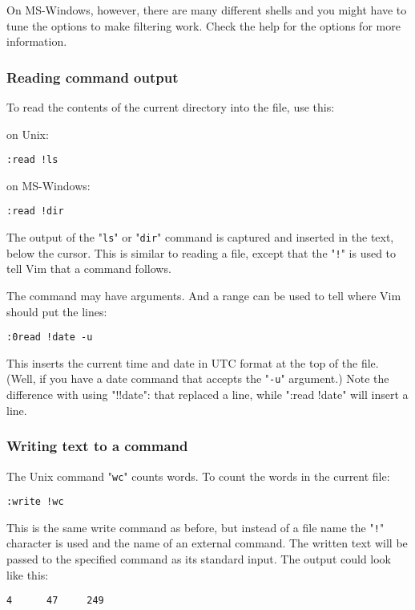 On MS-Windows, however, there are many different shells and you might have to tune the options to make filtering work.
Check the help for the options for more information.
\subsubsection{Reading command output}
To read the contents of the current directory into the file, use this:

on Unix:
\begin{Verbatim}[samepage=true]
 :read !ls
\end{Verbatim}
on MS-Windows:
\begin{Verbatim}[samepage=true]
 :read !dir
\end{Verbatim}

The output of the "\verb!ls!" or "\verb!dir!" command is captured and inserted in the text, below the cursor.
This is similar to reading a file, except that the "\verb:!:" is used to tell Vim that a command follows.

The command may have arguments.
And a range can be used to tell where Vim should put the lines:

\begin{Verbatim}[samepage=true]
 :0read !date -u
\end{Verbatim}

This inserts the current time and date in UTC format at the top of the file.
(Well, if you have a date command that accepts the "\verb!-u!" argument.) 
Note the difference with using "!!date": that replaced a line, while ":read !date" will insert a line.
\subsubsection{Writing text to a command}
The Unix command "\verb!wc!" counts words.
To count the words in the current file:

\begin{Verbatim}[samepage=true]
 :write !wc
\end{Verbatim}

This is the same write command as before, but instead of a file name the "\verb:!:" character is used and the name of an external command.
The written text will be passed to the specified command as its standard input.
The output could look like this:

\begin{Verbatim}[samepage=true]
       4      47     249 
\end{Verbatim}

